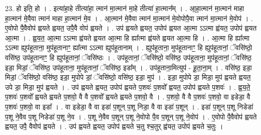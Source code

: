 \documentclass[17pt]{extarticle}
\begin{document}
23. हो इति॒ हो । . इत्या॑हा॒हे तीत्या॑हा॒ त्मान॑ मा॒त्मान॑ मा॒हे तीत्या॑ हा॒त्मान᳚म् । . आ॒हा॒त्मान॑ मा॒त्मान॑ माहा हा॒त्मान॑ मे॒वैवा त्मान॑ माहा हा॒त्मान॑ मे॒व । . आ॒त्मान॑ मे॒वैवा त्मान॑ मा॒त्मान॑ मे॒वोपोपै॒वा त्मान॑ मा॒त्मान॑ मे॒वोप॑ । . ए॒वोपो पै॒वैवोप॑ ह्वयते ह्वयत॒ उपै॒वै वोप॑ ह्वयते । . उप॑ ह्वयते ह्वयत॒ उपोप॑ ह्वयत आ॒त्मा ऽऽत्मा ह्व॑यत॒ उपोप॑ ह्वयत आ॒त्मा । . ह्व॒य॒त॒ आ॒त्मा ऽऽत्मा ह्व॑यते ह्वयत आ॒त्मा हि ह्या᳚त्मा ह्व॑यते ह्वयत आ॒त्मा हि । . आ॒त्मा हि ह्या᳚त्मा ऽऽत्मा ह्युप॑हूताना॒ मुप॑हूतानाꣳ॒॒ ह्या᳚त्मा ऽऽत्मा ह्युप॑हूतानाम् । . ह्युप॑हूताना॒ मुप॑हूतानाꣳ॒॒ हि ह्युप॑हूतानां॒ ॅवसि॑ष्ठो॒ वसि॑ष्ठ॒ उप॑हूतानाꣳ॒॒ हि ह्युप॑हूतानां॒ ॅवसि॑ष्ठः । . उप॑हूतानां॒ ॅवसि॑ष्ठो॒ वसि॑ष्ठ॒ उप॑हूताना॒ मुप॑हूतानां॒ ॅवसि॑ष्ठ॒ इडा॒ मिडां॒ ॅवसि॑ष्ठ॒ उप॑हूताना॒ मुप॑हूतानां॒ ॅवसि॑ष्ठ॒ इडा᳚म् । . उप॑हूताना॒मित्युप॑ - हू॒ता॒ना॒म् । . वसि॑ष्ठ॒ इडा॒ मिडां॒ ॅवसि॑ष्ठो॒ वसि॑ष्ठ॒ इडा॒ मुपोपे डां॒ ॅवसि॑ष्ठो॒ वसि॑ष्ठ॒ इडा॒ मुप॑ । . इडा॒ मुपोपे डा॒ मिडा॒ मुप॑ ह्वयते ह्वयत॒ उपे डा॒ मिडा॒ मुप॑ ह्वयते । . उप॑ ह्वयते ह्वयत॒ उपोप॑ ह्वयते प॒शवः॑ प॒शवो᳚ ह्वयत॒ उपोप॑ ह्वयते प॒शवः॑ । . ह्व॒य॒ते॒ प॒शवः॑ प॒शवो᳚ ह्वयते ह्वयते प॒शवो॒ वै वै प॒शवो᳚ ह्वयते ह्वयते प॒शवो॒ वै । . प॒शवो॒ वै वै प॒शवः॑ प॒शवो॒ वा इडेडा॒ वै प॒शवः॑ प॒शवो॒ वा इडा᳚ । . वा इडेडा॒ वै वा इडा॑ प॒शून् प॒शू निडा॒ वै वा इडा॑ प॒शून् । . इडा॑ प॒शून् प॒शू निडेडा॑ प॒शू ने॒वैव प॒शू निडेडा॑ प॒शू ने॒व । . प॒शू ने॒वैव प॒शून् प॒शू ने॒वोपो पै॒व प॒शून् प॒शू ने॒वोप॑ । . ए॒वोपो पै॒वैवोप॑ ह्वयते ह्वयत॒ उपै॒ वैवोप॑ ह्वयते । . उप॑ ह्वयते ह्वयत॒ उपोप॑ ह्वयते च॒तु श्च॒तुर् ह्व॑यत॒ उपोप॑ ह्वयते च॒तुः । \newline
\end{document}
